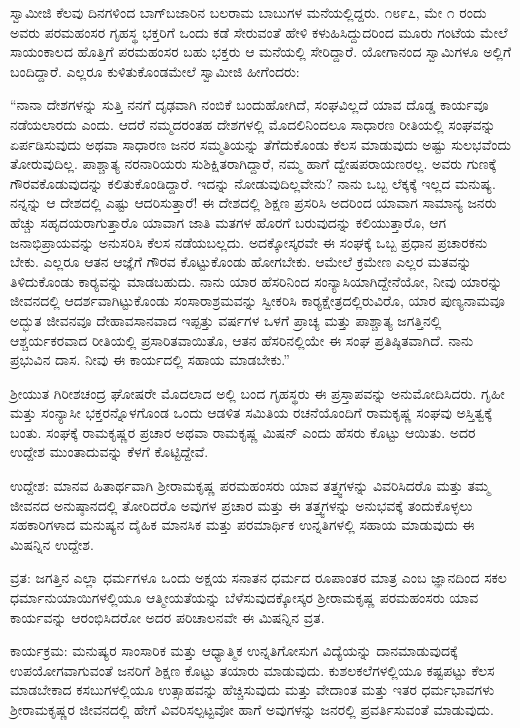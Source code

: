  ಸ್ವಾಮೀಜಿ ಕೆಲವು ದಿನಗಳಿಂದ ಬಾಗ್‍ಬಜಾರಿನ ಬಲರಾಮ ಬಾಬುಗಳ ಮನೆಯಲ್ಲಿದ್ದರು. ೧೮೯೭, ಮೇ ೧ ರಂದು ಅವರು ಪರಮಹಂಸರ ಗೃಹಸ್ಥ ಭಕ್ತರಿಗೆ ಒಂದು ಕಡೆ ಸೇರುವಂತೆ ಹೇಳಿ ಕಳುಹಿಸಿದ್ದುದರಿಂದ ಮೂರು ಗಂಟೆಯ ಮೇಲೆ ಸಾಯಂಕಾಲದ ಹೊತ್ತಿಗೆ ಪರಮಹಂಸರ ಬಹು ಭಕ್ತರು ಆ ಮನೆಯಲ್ಲಿ ಸೇರಿದ್ದಾರೆ. ಯೋಗಾನಂದ ಸ್ವಾಮಿಗಳೂ ಅಲ್ಲಿಗೆ ಬಂದಿದ್ದಾರೆ. ಎಲ್ಲರೂ ಕುಳಿತುಕೊಂಡಮೇಲೆ ಸ್ವಾಮೀಜಿ ಹೀಗೆಂದರು: 

 “ನಾನಾ ದೇಶಗಳನ್ನು ಸುತ್ತಿ ನನಗೆ ದೃಢವಾಗಿ ನಂಬಿಕೆ ಬಂದುಹೋಗಿದೆ, ಸಂಘವಿಲ್ಲದೆ ಯಾವ ದೊಡ್ಡ ಕಾರ್ಯವೂ ನಡೆಯಲಾರದು ಎಂದು. ಆದರೆ ನಮ್ಮದರಂತಹ ದೇಶಗಳಲ್ಲಿ ಮೊದಲಿನಿಂದಲೂ ಸಾಧಾರಣ ರೀತಿಯಲ್ಲಿ ಸಂಘವನ್ನು ಏರ್ಪಡಿಸುವುದು ಅಥವಾ ಸಾಧಾರಣ ಜನರ ಸಮ್ಮತಿಯನ್ನು ತೆಗೆದುಕೊಂಡು ಕೆಲಸ ಮಾಡುವುದು ಅಷ್ಟು ಸುಲಭವೆಂದು ತೋರುವುದಿಲ್ಲ. ಪಾಶ್ಚಾತ್ಯ ನರನಾರಿಯರು ಸುಶಿಕ್ಷಿತರಾಗಿದ್ದಾರೆ, ನಮ್ಮ ಹಾಗೆ ದ್ವೇಷಪರಾಯಣರಲ್ಲ. ಅವರು ಗುಣಕ್ಕೆ ಗೌರವಕೊಡುವುದನ್ನು ಕಲಿತುಕೊಂಡಿದ್ದಾರೆ. ಇದನ್ನು ನೋಡುವುದಿಲ್ಲವೇನು? ನಾನು ಒಬ್ಬ ಲೆಕ್ಕಕ್ಕೆ ಇಲ್ಲದ ಮನುಷ್ಯ. ನನ್ನನ್ನು ಆ ದೇಶದಲ್ಲಿ ಎಷ್ಟು ಆದರಿಸುತ್ತಾರೆ! ಈ ದೇಶದಲ್ಲಿ ಶಿಕ್ಷಣ ಪ್ರಸರಿಸಿ ಅದರಿಂದ ಯಾವಾಗ ಸಾಮಾನ್ಯ ಜನರು ಹೆಚ್ಚು ಸಹೃದಯರಾಗುತ್ತಾರೊ ಯಾವಾಗ ಜಾತಿ ಮತಗಳ ಹೊರಗೆ ಬರುವುದನ್ನು ಕಲಿಯುತ್ತಾರೊ, ಆಗ ಜನಾಭಿಪ್ರಾಯವನ್ನು ಅನುಸರಿಸಿ ಕೆಲಸ ನಡೆಯಬಲ್ಲದು. ಅದಕ್ಕೋಸ್ಕರವೇ ಈ ಸಂಘಕ್ಕೆ ಒಬ್ಬ ಪ್ರಧಾನ ಪ್ರಚಾರಕನು ಬೇಕು. ಎಲ್ಲರೂ ಆತನ ಆಜ್ಞೆಗೆ ಗೌರವ ಕೊಟ್ಟುಕೊಂಡು ಹೋಗಬೇಕು. ಆಮೇಲೆ ಕ್ರಮೇಣ ಎಲ್ಲರ ಮತವನ್ನು ತಿಳಿದುಕೊಂಡು ಕಾರ‍್ಯವನ್ನು ಮಾಡಬಹುದು. ನಾನು ಯಾರ ಹೆಸರಿನಿಂದ ಸಂನ್ಯಾಸಿಯಾಗಿದ್ದೇನೆಯೋ, ನೀವು ಯಾರನ್ನು ಜೀವನದಲ್ಲಿ ಆದರ್ಶವಾಗಿಟ್ಟುಕೊಂಡು ಸಂಸಾರಾಶ್ರಮವನ್ನು ಸ್ವೀಕರಿಸಿ ಕಾರ‍್ಯಕ್ಷೇತ್ರದಲ್ಲಿರುವಿರೊ, ಯಾರ ಪುಣ್ಯನಾಮವೂ ಅದ್ಭುತ ಜೀವನವೂ‌ ದೇಹಾವಸಾನವಾದ ಇಪ್ಪತ್ತು ವರ್ಷಗಳ ಒಳಗೆ ಪ್ರಾಚ್ಯ ಮತ್ತು ಪಾಶ್ಚಾತ್ಯ ಜಗತ್ತಿನಲ್ಲಿ ಆಶ್ಚರ್ಯಕರವಾದ ರೀತಿಯಲ್ಲಿ ಪ್ರಸಾರಿತವಾಯಿತೊ, ಆತನ ಹೆಸರಿನಲ್ಲಿಯೇ ಈ ಸಂಘ ಪ್ರತಿಷ್ಠಿತವಾಗಿದೆ. ನಾನು ಪ್ರಭುವಿನ ದಾಸ. ನೀವು ಈ ಕಾರ್ಯದಲ್ಲಿ ಸಹಾಯ ಮಾಡಬೇಕು.” 

 ಶ‍್ರೀಯುತ ಗಿರೀಶಚಂದ್ರ ಘೋಷರೇ ಮೊದಲಾದ ಅಲ್ಲಿ ಬಂದ ಗೃಹಸ್ಥರು ಈ ಪ್ರಸ್ತಾಪವನ್ನು ಅನುಮೋದಿಸಿದರು. ಗೃಹೀ ಮತ್ತು ಸಂನ್ಯಾಸೀ ಭಕ್ತರನ್ನೊಳಗೊಂಡ ಒಂದು ಆಡಳಿತ ಸಮಿತಿಯ ರಚನೆಯೊಂದಿಗೆ ರಾಮಕೃಷ್ಣ ಸಂಘವು ಅಸ್ತಿತ್ವಕ್ಕೆ ಬಂತು. ಸಂಘಕ್ಕೆ ರಾಮಕೃಷ್ಣರ ಪ್ರಚಾರ ಅಥವಾ ರಾಮಕೃಷ್ಣ ಮಿಷನ್ ಎಂದು ಹೆಸರು ಕೊಟ್ಟು ಆಯಿತು. ಅದರ ಉದ್ದೇಶ ಮುಂತಾದುವನ್ನು ಕೆಳಗೆ ಕೊಟ್ಟಿದ್ದೇವೆ. 

 ಉದ್ದೇಶ: ಮಾನವ ಹಿತಾರ್ಥವಾಗಿ ಶ‍್ರೀರಾಮಕೃಷ್ಣ ಪರಮಹಂಸರು ಯಾವ ತತ್ತ್ವಗಳನ್ನು ವಿವರಿಸಿದರೊ ಮತ್ತು ತಮ್ಮ ಜೀವನದ ಅನುಷ್ಠಾನದಲ್ಲಿ ತೋರಿದರೊ ಅವುಗಳ ಪ್ರಚಾರ ಮತ್ತು ಈ ತತ್ತ್ವಗಳನ್ನು ಅನುಭವಕ್ಕೆ ತಂದುಕೊಳ್ಳಲು ಸಹಕಾರಿಗಳಾದ ಮನುಷ್ಯನ ದೈಹಿಕ ಮಾನಸಿಕ ಮತ್ತು ಪರಮಾರ್ಥಿಕ ಉನ್ನತಿಗಳಲ್ಲಿ ಸಹಾಯ ಮಾಡುವುದು ಈ ಮಿಷನ್ನಿನ ಉದ್ದೇಶ. 

 ವ್ರತ: ಜಗತ್ತಿನ ಎಲ್ಲಾ ಧರ್ಮಗಳೂ ಒಂದು ಅಕ್ಷಯ ಸನಾತನ ಧರ್ಮದ ರೂಪಾಂತರ ಮಾತ್ರ ಎಂಬ ಜ್ಞಾನದಿಂದ ಸಕಲ ಧರ್ಮಾನುಯಾಯಿಗಳಲ್ಲಿಯೂ ಆತ್ಮೀಯತೆಯನ್ನು ಬೆಳೆಸುವುದಕ್ಕೋಸ್ಕರ ಶ‍್ರೀರಾಮಕೃಷ್ಣ ಪರಮಹಂಸರು ಯಾವ ಕಾರ್ಯವನ್ನು ಆರಂಭಿಸಿದರೋ ಅದರ ಪರಿಚಾಲನವೇ ಈ ಮಿಷನ್ನಿನ ವ್ರತ. 

 ಕಾರ್ಯಕ್ರಮ: ಮನುಷ್ಯರ ಸಾಂಸಾರಿಕ ಮತ್ತು ಆಧ್ಯಾತ್ಮಿಕ ಉನ್ನತಿಗೋಸುಗ ವಿದ್ಯೆಯನ್ನು ದಾನಮಾಡುವುದಕ್ಕೆ ಉಪಯೋಗವಾಗುವಂತೆ ಜನರಿಗೆ ಶಿಕ್ಷಣ ಕೊಟ್ಟು ತಯಾರು ಮಾಡುವುದು. ಕುಶಲಕಲೆಗಳಲ್ಲಿಯೂ ಕಷ್ಟಪಟ್ಟು ಕೆಲಸ ಮಾಡಬೇಕಾದ ಕಸಬುಗಳಲ್ಲಿಯೂ ಉತ್ಸಾಹವನ್ನು ಹೆಚ್ಚಿಸುವುದು ಮತ್ತು ವೇದಾಂತ ಮತ್ತು ಇತರ ಧರ್ಮಭಾವಗಳು ಶ‍್ರೀರಾಮಕೃಷ್ಣರ ಜೀವನದಲ್ಲಿ ಹೇಗೆ ವಿವರಿಸಲ್ಪಟ್ಟವೋ‌ ಹಾಗೆ ಅವುಗಳನ್ನು ಜನರಲ್ಲಿ ಪ್ರವರ್ತಿಸುವಂತೆ ಮಾಡುವುದು. 

